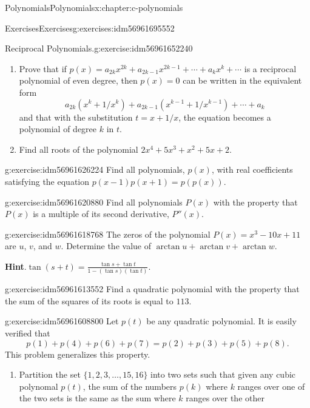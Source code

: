 \documentclass[twoside,10pt,]{book}
\newcommand{\blocktitlefont}{\relax}
\numberwithin{equation}{section}
\begin{document}
\begin{chapterptx}{Polynomials}{}{Polynomials}{}{}{x:chapter:c-polynomials}
\begin{exercises-section}{Exercises}{}{Exercises}{}{}{g:exercises:idm56961695552}
\begin{divisionexercise}{7}{Reciprocal Polynomials.}{}{g:exercise:idm56961652240}
\begin{enumerate}[label=(\alph*)]
\item{}Prove that if \(p(x) = a_{2k} x^{2k} + a_{2k-1}x^{2k-1}+ \cdots +a_{k} x^k + \cdots\) is a reciprocal polynomial of even degree, then \(p(x)= 0\) can be written in the equivalent form%
\begin{equation*}
a_{2k} (x^k+1/x^k) + a_{2k-1} (x^{k-1}+1/x^{k-1}) + \cdots +a_{k} 
\end{equation*}
and that with the substitution \(t=x+1/x\), the equation becomes a polynomial of degree \(k\) in \(t\).%
\item{}Find all roots of the polynomial \(2 x^4 + 5 x^3 + x^2 + 5 x + 2\).%
\end{enumerate}
%
\end{divisionexercise}%
\begin{divisionexercise}{8}{}{}{g:exercise:idm56961626224}%
Find all polynomials, \(p(x)\), with real coefficients satisfying the equation \(p(x-1)p(x+1) = p(p(x))\).%
\end{divisionexercise}%
\begin{divisionexercise}{9}{}{}{g:exercise:idm56961620880}%
Find all polynomials \(P(x)\) with the property that \(P(x)\) is a multiple of its second derivative, \(P''(x)\).%
\end{divisionexercise}%
\begin{divisionexercise}{10}{}{}{g:exercise:idm56961618768}%
The zeros of the polynomial \(P(x) = x^3 - 10x + 11\) are \(u\), \(v\), and \(w\). Determine the value of \(\arctan  u + \arctan v + \arctan  w\).%
\par\smallskip%
\noindent\textbf{\blocktitlefont Hint}.\hypertarget{g:hint:idm56961617936}{}\quad{}\(\tan(s+t)=\frac{\tan  s + \tan  t }{1-(\tan  s )(\tan  t)}\).%
\end{divisionexercise}%
\begin{divisionexercise}{11}{}{}{g:exercise:idm56961613552}%
Find a quadratic polynomial with the property that the sum of the squares of its roots is equal to \(113\).%
\end{divisionexercise}%
\begin{divisionexercise}{12}{}{}{g:exercise:idm56961608800}%
Let \(p(t)\) be any quadratic polynomial.  It is easily verified that%
\begin{equation*}
p(1)+p(4)+p(6)+p(7) = p(2)+p(3)+p(5)+p(8).
\end{equation*}
This problem generalizes this property.%
\begin{enumerate}[label=(\alph*)]
\item{}Partition the set \(\{1, 2, 3, \dots , 15, 16\}\) into two sets such that given any cubic polynomal \(p(t)\), the sum of the numbers \(p(k)\) where \(k\) ranges over one of  the two sets is the same as the sum where \(k\) ranges over the other%

\end{enumerate}
\end{divisionexercise}
\end{exercises-section}
\end{chapterptx}
\end{document}
